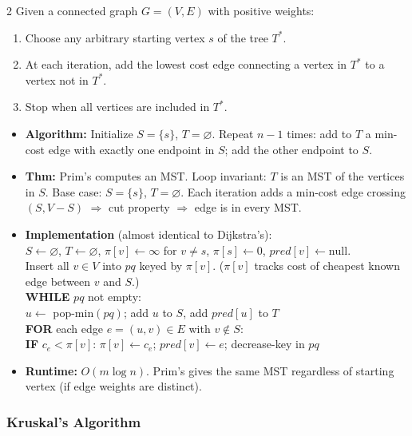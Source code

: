 \documentclass[9pt]{article}
\begin{document}
\begin{multicols}{2}
Given a connected graph $G=(V,E)$ with positive weights:
\begin{enumerate}
  \item Choose any arbitrary starting vertex $s$ of the tree $T^*$.
  \item At each iteration, add the lowest cost edge connecting a vertex in $T^*$ to a vertex not in $T^*$.
  \item Stop when all vertices are included in $T^*$.
\end{enumerate}

\begin{itemize}
  \item \textbf{Algorithm:} Initialize $S=\{s\}$, $T=\varnothing$. Repeat $n-1$ times: add to $T$ a min-cost edge with exactly one endpoint in $S$; add the other endpoint to $S$.
  \item \textbf{Thm:} Prim's computes an MST. Loop invariant: $T$ is an MST of the vertices in $S$. Base case: $S=\{s\}$, $T=\varnothing$. Each iteration adds a min-cost edge crossing $(S, V-S)$ $\Rightarrow$ cut property $\Rightarrow$ edge is in every MST.
  \item \textbf{Implementation} (almost identical to Dijkstra's):\\
  $S\leftarrow\varnothing$,\; $T\leftarrow\varnothing$,\; $\pi[v]\leftarrow\infty$ for $v\ne s$,\; $\pi[s]\leftarrow0$,\; $pred[v]\leftarrow\mathrm{null}$.\\
  Insert all $v\in V$ into $pq$ keyed by $\pi[v]$. ($\pi[v]$ tracks cost of cheapest known edge between $v$ and $S$.)\\
  \textbf{WHILE} $pq$ not empty:\\
  \hspace*{8pt}$u\leftarrow$ pop-min$(pq)$;\; add $u$ to $S$,\; add $pred[u]$ to $T$\\
  \hspace*{8pt}\textbf{FOR} each edge $e=(u,v)\in E$ with $v\not\in S$:\\
  \hspace*{16pt}\textbf{IF} $c_e<\pi[v]$:\; $\pi[v]\leftarrow c_e$;\; $pred[v]\leftarrow e$;\; decrease-key in $pq$
  \item \textbf{Runtime:} $O(m\log n)$. Prim's gives the same MST regardless of starting vertex (if edge weights are distinct).
\end{itemize}

\subsubsection*{Kruskal's Algorithm}


\end{multicols}
\end{document}

